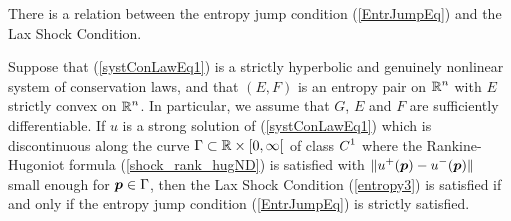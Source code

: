 There is a relation between the entropy jump condition
(\ref{EntrJumpEq}) and the Lax Shock Condition.

\begin{theorem}
Suppose that (\ref{systConLawEq1}) is a strictly hyperbolic and
genuinely nonlinear system of conservation laws, and that
$(E,F)$ is an entropy pair on $\displaystyle \mathbb{R}^n$ with $E$ strictly convex on
$\displaystyle \mathbb{R}^n$.  In particular, we assume that $G$, $E$ and $F$ are
sufficiently differentiable.
If $u$ is a strong solution of (\ref{systConLawEq1}) which
is discontinuous along the curve $\Gamma \subset \mathbb{R} \times [0,\infty[$ of
class $\displaystyle C^1$ where the Rankine-Hugoniot formula
(\ref{shock_rank_hugND}) is satisfied with
$\displaystyle \|u^+({\bm{p}})-u^-({\bm{p}})\|$ small enough for
${\bm{p}} \in \Gamma$, then the Lax Shock Condition (\ref{entropy3}) is
satisfied if and only if the entropy jump condition (\ref{EntrJumpEq})
is strictly satisfied.
\end{theorem}

